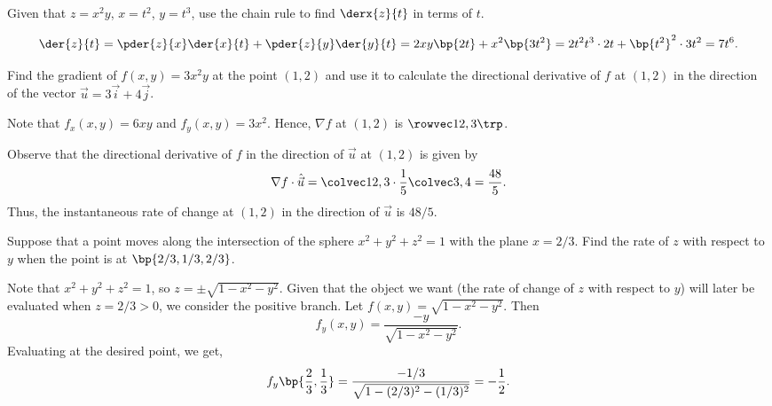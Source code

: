 \begin{problem}
    Given that $z = x^2y$, $x = t^2$, $y = t^3$, use the chain rule to find $\derx{z}{t}$ in terms of $t$.
\end{problem}
\begin{solution}
    \[\der{z}{t} = \pder{z}{x} \der{x}{t} + \pder{z}{y} \der{y}{t} = 2xy \bp{2t} + x^2 \bp{3t^2} = 2t^2t^3 \cdot 2t + \bp{t^2}^2 \cdot 3t^2 = 7t^6.\]
\end{solution}

\begin{problem}
    Find the gradient of $f(x, y) = 3x^2y$ at the point $(1, 2)$ and use it to calculate the directional derivative of $f$ at $(1, 2)$ in the direction of the vector $\vec u = 3\vec i + 4\vec j$.
\end{problem}
\begin{solution}
    Note that $f_x(x, y) = 6xy$ and $f_y(x, y) = 3x^2$. Hence, $\nabla f$ at $(1, 2)$ is $\cveciix{12}{3}$. 
            
    Observe that the directional derivative of $f$ in the direction of $\vec u$ at $(1, 2)$ is given by \[\nabla f \cdot \hat{\vec u} = \cvecii{12}3 \cdot \frac15 \cvecii34 = \frac{48}5.\] Thus, the instantaneous rate of change at $(1, 2)$ in the direction of $\vec u$ is $48/5$.
\end{solution}

\begin{problem}
    Suppose that a point moves along the intersection of the sphere $x^2 + y^2 + z^2 = 1$ with the plane $x = 2/3$. Find the rate of $z$ with respect to $y$ when the point is at $\bp{2/3, 1/3, 2/3}$.
\end{problem}
\begin{solution}
    Note that $x^2 + y^2 + z^2 = 1$, so $z = \pm \sqrt{1 - x^2 - y^2}$. Given that the object we want (the rate of change of $z$ with respect to $y$) will later be evaluated when $z = 2/3 > 0$, we consider the positive branch. Let $f(x, y) = \sqrt{1 - x^2 - y^2}$. Then \[f_y(x, y) = \frac{-y}{\sqrt{1 - x^2 - y^2}}.\] Evaluating at the desired point, we get, \[f_y\bp{\frac23, \frac13} = \frac{-1/3}{\sqrt{1 - (2/3)^2 - (1/3)^2}} = -\frac12.\]
\end{solution}

